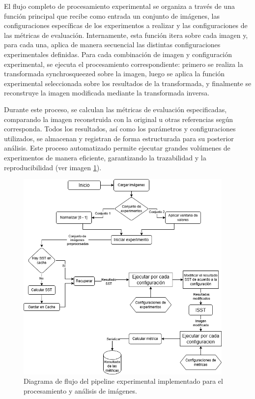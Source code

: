 El flujo completo de procesamiento experimental se organiza a través de una función principal que recibe como entrada un conjunto de imágenes, las configuraciones específicas de los experimentos a realizar y las configuraciones de las métricas de evaluación. Internamente, esta función itera sobre cada imagen y, para cada una, aplica de manera secuencial las distintas configuraciones experimentales definidas. Para cada combinación de imagen y configuración experimental, se ejecuta el procesamiento correspondiente: primero se realiza la transformada synchrosqueezed sobre la imagen, luego se aplica la función experimental seleccionada sobre los resultados de la transformada, y finalmente se reconstruye la imagen modificada mediante la transformada inversa.

Durante este proceso, se calculan las métricas de evaluación especificadas, comparando la imagen reconstruida con la original u otras referencias según corresponda. Todos los resultados, así como los parámetros y configuraciones utilizados, se almacenan y registran de forma estructurada para su posterior análisis. Este proceso automatizado permite ejecutar grandes volúmenes de experimentos de manera eficiente, garantizando la trazabilidad y la reproducibilidad (ver imagen \ref{fig:diagrama-flujo-experimentos}).

\begin{figure}[H]
    \centering
    \includegraphics[width=0.95\textwidth]{Graphics/diagrama experimentos tesis.drawio.png}
    \caption{Diagrama de flujo del pipeline experimental implementado para el procesamiento y análisis de imágenes.}
    \label{fig:diagrama-flujo-experimentos}
\end{figure}


